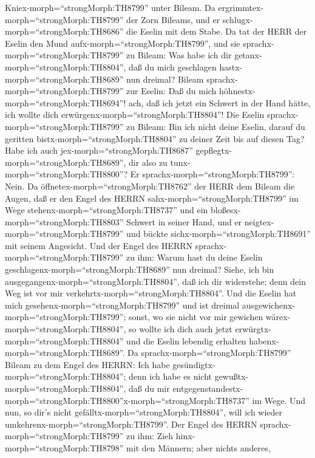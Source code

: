 Kniex-morph=``strongMorph:TH8799'' unter Bileam. Da
ergrimmtex-morph=``strongMorph:TH8799'' der Zorn Bileams, und er
schlugx-morph=``strongMorph:TH8686'' die Eselin mit dem Stabe.
 Da tat der HERR der Eselin den Mund
aufx-morph=``strongMorph:TH8799'', und sie
sprachx-morph=``strongMorph:TH8799'' zu Bileam: Was habe ich dir
getanx-morph=``strongMorph:TH8804'', daß du mich geschlagen
hastx-morph=``strongMorph:TH8689'' nun dreimal?  Bileam
sprachx-morph=``strongMorph:TH8799'' zur Eselin: Daß du mich
höhnestx-morph=``strongMorph:TH8694''! ach, daß ich jetzt ein Schwert in
der Hand hätte, ich wollte dich erwürgenx-morph=``strongMorph:TH8804''!
 Die Eselin sprachx-morph=``strongMorph:TH8799'' zu Bileam:
Bin ich nicht deine Eselin, darauf du geritten
bistx-morph=``strongMorph:TH8804'' zu deiner Zeit bis auf diesen Tag?
Habe ich auch jex-morph=``strongMorph:TH8687''
gepflegtx-morph=``strongMorph:TH8689'', dir also zu
tunx-morph=``strongMorph:TH8800''? Er
sprachx-morph=``strongMorph:TH8799'': Nein.  Da
öffnetex-morph=``strongMorph:TH8762'' der HERR dem Bileam die Augen, daß
er den Engel des HERRN sahx-morph=``strongMorph:TH8799'' im Wege
stehenx-morph=``strongMorph:TH8737'' und ein
bloßesx-morph=``strongMorph:TH8803'' Schwert in seiner Hand, und er
neigtex-morph=``strongMorph:TH8799'' und bückte
sichx-morph=``strongMorph:TH8691'' mit seinem Angesicht. 
Und der Engel des HERRN sprachx-morph=``strongMorph:TH8799'' zu ihm:
Warum hast du deine Eselin geschlagenx-morph=``strongMorph:TH8689'' nun
dreimal? Siehe, ich bin ausgegangenx-morph=``strongMorph:TH8804'', daß
ich dir widerstehe; denn dein Weg ist vor mir
verkehrtx-morph=``strongMorph:TH8804''.  Und die Eselin hat
mich gesehenx-morph=``strongMorph:TH8799'' und ist dreimal
ausgewichenx-morph=``strongMorph:TH8799''; sonst, wo sie nicht vor mir
gewichen wärex-morph=``strongMorph:TH8804'', so wollte ich dich auch
jetzt erwürgtx-morph=``strongMorph:TH8804'' und die Eselin lebendig
erhalten habenx-morph=``strongMorph:TH8689''.  Da
sprachx-morph=``strongMorph:TH8799'' Bileam zu dem Engel des HERRN: Ich
habe gesündigtx-morph=``strongMorph:TH8804''; denn ich habe es nicht
gewußtx-morph=``strongMorph:TH8804'', daß du mir
entgegenstandestx-morph=``strongMorph:TH8800''x-morph=``strongMorph:TH8737''
im Wege. Und nun, so dir's nicht gefälltx-morph=``strongMorph:TH8804'',
will ich wieder umkehrenx-morph=``strongMorph:TH8799''. 
Der Engel des HERRN sprachx-morph=``strongMorph:TH8799'' zu ihm: Zieh
hinx-morph=``strongMorph:TH8798'' mit den Männern; aber nichts anderes,
